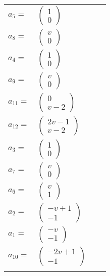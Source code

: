 \documentclass[1p]{elsarticle_modified}
\theoremstyle{definition}
\begin{document}
\begin{tabular}{m{7pt} m{180pt} m{7pt} m{180pt} }
\flushright $a_{5}=$&$\begin{pmatrix}1\\0\end{pmatrix}$ \\
\flushright $a_{8}=$&$\begin{pmatrix}v\\0\end{pmatrix}$ \\
\flushright $a_{4}=$&$\begin{pmatrix}1\\0\end{pmatrix}$ \\
\flushright $a_{9}=$&$\begin{pmatrix}v\\0\end{pmatrix}$ \\
\flushright $a_{11}=$&$\begin{pmatrix}0\\v-2\end{pmatrix}$ \\
\flushright $a_{12}=$&$\begin{pmatrix}2 v-1\\v-2\end{pmatrix}$ \\
\flushright $a_{3}=$&$\begin{pmatrix}1\\0\end{pmatrix}$ \\
\flushright $a_{7}=$&$\begin{pmatrix}v\\0\end{pmatrix}$ \\
\flushright $a_{6}=$&$\begin{pmatrix}v\\1\end{pmatrix}$ \\
\flushright $a_{2}=$&$\begin{pmatrix}- v+1\\-1\end{pmatrix}$ \\
\flushright $a_{1}=$&$\begin{pmatrix}- v\\-1\end{pmatrix}$ \\
\flushright $a_{10}=$&$\begin{pmatrix}-2 v+1\\-1\end{pmatrix}$\\&\end{tabular}
\end{document}
